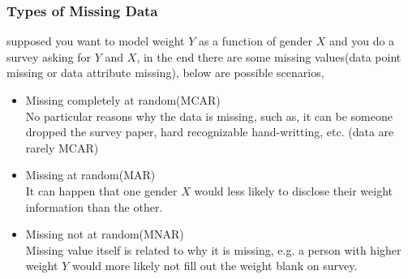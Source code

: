 \documentclass{beamer}
\begin{document}
\begin{frame}
\frametitle{Types of Missing Data}

supposed you want to model weight $Y$ as a function of gender $X$ and you do a survey asking for $Y$ and $X$, in the end there are some missing values(data point missing or data attribute missing), below are possible scenarios,
\begin{itemize}
\item{Missing completely at random(MCAR)}\\
No particular reasons why the data is missing, such as, it can be someone dropped the survey paper, hard recognizable hand-writting, etc. (data are rarely MCAR) 
\item{Missing at random(MAR)}\\
It can happen that one gender $X$ would less likely to disclose their weight information than the other.
\item{Missing not at random(MNAR)}\\
Missing value itself is related to why it is missing, e.g. a person with higher weight $Y$ would more likely not fill out the weight blank on survey. 
\end{itemize}
\end{frame}

\end{document}
